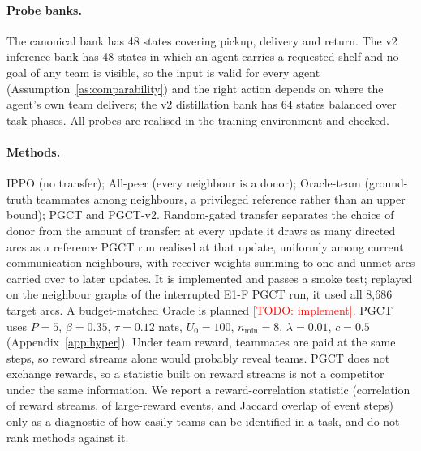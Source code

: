 \documentclass{article}
\theoremstyle{remark}
\newcommand{\todo}[1]{\textcolor{red}{[TODO: #1]}}
\newcommand{\ours}{PGCT}
\begin{document}
\begin{table}[t]
\centering
\small
{}
\caption{Tasks placed on the two axes of the analysis. E1: identifiability ruled out by Proposition~\ref{prop:nonid}, and in
frozen curriculum models blending with a non-teammate's critic helped more than blending with a teammate's. E1-F, B, A:
identifiability expected from the goal layout; compatibility to be measured \todo{place B after measurement}.}
\label{tab:axes}
\end{table}

\paragraph{Probe banks.} The canonical bank has 48 states covering pickup, delivery and return. The v2 inference bank has 48
states in which an agent carries a requested shelf and no goal of any team is visible, so the input is valid for every agent
(Assumption~\ref{as:comparability}) and the right action depends on where the agent's own team delivers; the v2 distillation
bank has 64 states balanced over task phases. All probes are realised in the training environment and checked.

\paragraph{Methods.} IPPO (no transfer); All-peer (every neighbour is a donor); Oracle-team (ground-truth teammates among
neighbours, a privileged reference rather than an upper bound); \ours{} and \ours{}-v2. Random-gated transfer separates the
choice of donor from the amount of transfer: at every update it draws as many directed arcs as a reference \ours{} run
realised at that update, uniformly among current communication neighbours, with receiver weights summing to one and
unmet arcs carried over to later updates. It is implemented and passes a smoke test; replayed on the neighbour graphs of the
interrupted E1-F \ours{} run, it used all 8{,}686 target arcs. A budget-matched Oracle is planned \todo{implement}.
\ours{} uses $P=5$, $\beta=0.35$, $\tau=0.12$ nats, $U_0=100$, $n_{\min}=8$, $\lambda=0.01$, $c=0.5$ (Appendix~\ref{app:hyper}). Under team
reward, teammates are paid at the same steps, so reward streams alone would probably reveal teams. \ours{} does not exchange
rewards, so a statistic built on reward streams is not a competitor under the same information. We report a reward-correlation
statistic (correlation of reward streams, of large-reward events, and Jaccard overlap of event steps) only as a diagnostic of how
easily teams can be identified in a task, and do not rank methods against it.
\end{document}
